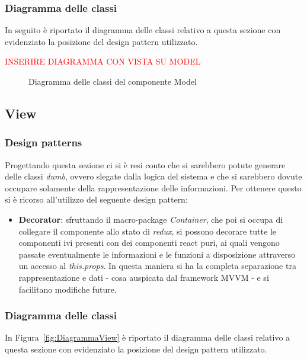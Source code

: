 		\subsubsection{Diagramma delle classi}
		In seguito è riportato il diagramma delle classi relativo a questa sezione con evidenziato la posizione del design pattern utilizzato.
	
	{\textcolor{red}{INSERIRE DIAGRAMMA CON VISTA SU MODEL}}
	\begin{figure}[h]
		\centering
		\caption{Diagramma delle classi del componente Model}
		\label{}
	\end{figure}
	
	\subsection{View}
		\subsubsection{Design patterns}
		Progettando questa sezione ci si è resi conto che si sarebbero potute generare delle classi \emph{dumb}, ovvero slegate dalla logica del sistema e che si sarebbero dovute occupare solamente della rappresentazione delle informazioni. Per ottenere questo si è ricorso all'utilizzo del seguente design pattern:
			\begin{itemize}
				\item \textbf{Decorator}: sfruttando il macro-package \emph{Container}, che poi si occupa di collegare il componente allo stato di \emph{redux}, si possono decorare tutte le componenti ivi presenti con dei componenti react puri, ai quali vengono passate eventualmente le informazioni e le funzioni a disposizione attraverso un accesso al \emph{this.props}. In questa maniera si ha la completa separazione tra rappresentazione e dati - cosa auspicata dal framework MVVM - e si facilitano modifiche future.
			\end{itemize}
		
		\subsubsection{Diagramma delle classi}
		In Figura~\ref{fig:DiagrammaView} è riportato il diagramma delle classi relativo a questa sezione con evidenziato la posizione del design pattern utilizzato.
	

